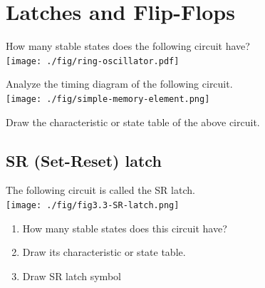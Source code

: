 \section{Latches and Flip-Flops \cite[Sec~3.2]{harris2022digital}}

\begin{example} \cite[Sec~3.31]{harris2022digital}
  How many stable states does the following circuit have?\\
  \texttt{[image: ./fig/ring-oscillator.pdf]} 
\end{example}
\vspace{10em}

\begin{definition}
\end{definition}
\vspace{5em}


\begin{example}
  Analyze the timing diagram of the following circuit.\\
  \texttt{[image: ./fig/simple-memory-element.png]}
\end{example}
\vspace{10em}

\begin{definition}
\end{definition}
\vspace{5em}

\begin{definition}
  Draw the characteristic or state table of the above circuit. 
\end{definition}
\vspace{10em}



\subsection{SR (Set-Reset) latch \cite[Sec~3.2.1]{harris2022digital}}

\begin{definition}[SR latch]
  The following circuit is called the SR latch. \\
  \texttt{[image: ./fig/fig3.3-SR-latch.png]} \\
  \begin{enumerate}
    \item How many stable states does this circuit have?
    \item Draw its characteristic or state table.
    \item Draw SR latch symbol
  \end{enumerate}
\end{definition}
\vspace{20em}


